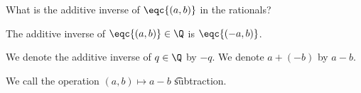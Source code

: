 

What is the additive inverse of $\eqc{(a, b)}$ in the rationals?


\begin{proposition}
  The additive inverse of $\eqc{(a, b)} \in \Q$ is $\eqc{(-a, b)}$.
\end{proposition}


We denote the additive inverse of $q \in \Q$ by $-q$.
We denote $a + (- b)$ by $a - b$.


We call the operation $(a, b) \mapsto a - b$ \t{subtraction}.

\blankpage
